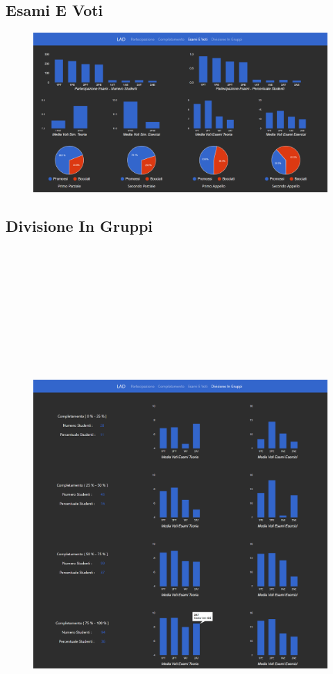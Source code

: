 \subsection{Esami E Voti}

\begin{figure}[H]
	\centering
	\includegraphics[width=160mm]{../Immagini/7}
\end{figure}

\subsection{Divisione In Gruppi}

\begin{figure}[H]
	\centering
	\includegraphics[width=160mm,height= 210mm]{../Immagini/8}
\end{figure}


